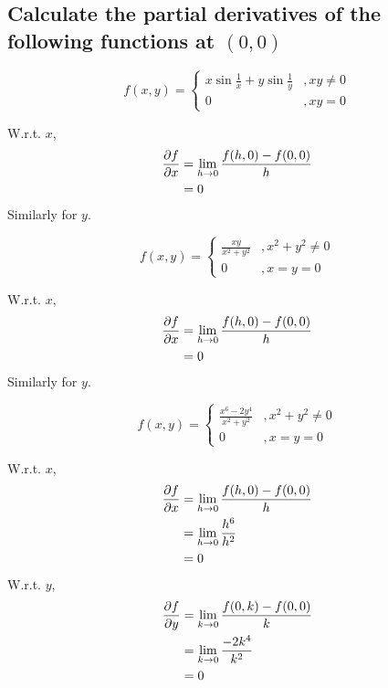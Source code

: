 \subsection{Calculate the partial derivatives of the following functions at $(0,0)$}
\begin{asign}
	\[f(x,y)=\begin{cases}
		x\sin\frac{1}{x}+y\sin\frac{1}{y} &, xy\neq0\\
		0 &, xy=0
	\end{cases}\]
\end{asign}
\begin{anse}
	W.r.t. $x$,
	\[\begin{split}
		\pdv{f}{x}&=\lim\limits_{h\to0}\frac{f(h,0)-f(0,0)}{h}\\
		&=0
	\end{split}\]
	Similarly for $y$.
\end{anse}
\begin{asign}
	\[f(x,y)=\begin{cases}
		\frac{xy}{x^2+y^2} &, x^2+y^2\neq0\\
		0 &, x=y=0
	\end{cases}\]
\end{asign}
\begin{anse}
	W.r.t. $x$,
	\[\begin{split}
		\pdv{f}{x}&=\lim\limits_{h\to0}\frac{f(h,0)-f(0,0)}{h}\\
		&=0 
	\end{split}\]
	Similarly for $y$.
\end{anse}
\begin{asign}
	\[f(x,y)=\begin{cases}
		\frac{x^6-2y^4}{x^2+y^2} &, x^2+y^2\neq0\\
		0 &, x=y=0
	\end{cases}\]
\end{asign}
\begin{anse}
	W.r.t. $x$,
	\[\begin{split}
		\pdv{f}{x}&=\lim\limits_{h\to0}\frac{f(h,0)-f(0,0)}{h}\\
		&=\lim\limits_{h\to0}\frac{h^6}{h^2}\\
		&=0
	\end{split}\]
	W.r.t. $y$,
	\[\begin{split}
		\pdv{f}{y}&=\lim\limits_{k\to0}\frac{f(0,k)-f(0,0)}{k}\\
		&=\lim\limits_{k\to0} \frac{-2k^4}{k^2}\\
		&=0
	\end{split}\]
\end{anse}
